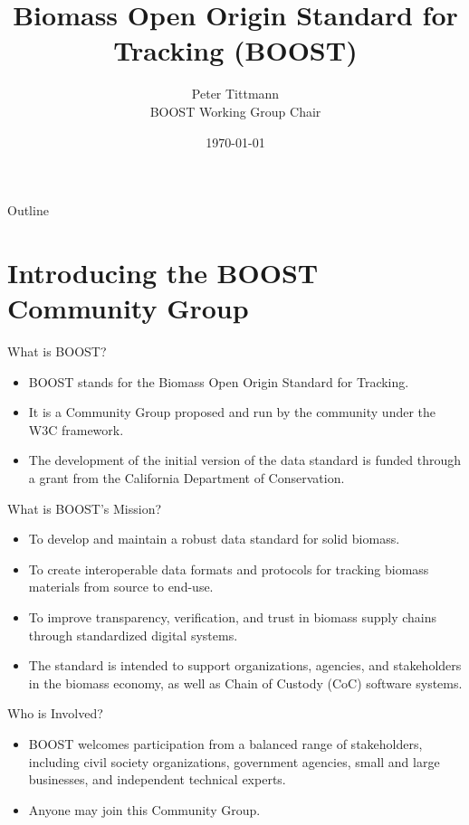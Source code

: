 \documentclass[presentation]{beamer}
\author{Peter Tittmann \\ BOOST Working Group Chair}
\date{\today}
\title{Biomass Open Origin Standard for Tracking (BOOST)}
\begin{document}
\begin{frame}{Outline}
\tableofcontents
\end{frame}

\maketitle
\section{Introducing the BOOST Community Group}
\label{introducing-the-boost-community-group}
\begin{frame}[label={sec:org826eb60}]{What is BOOST?}
\begin{itemize}
\item BOOST stands for the Biomass Open Origin Standard for Tracking.
\item It is a Community Group proposed and run by the community under the W3C framework.
\item The development of the initial version of the data standard is funded through a grant from the California Department of Conservation.
\end{itemize}
\end{frame}
\begin{frame}[label={sec:org54f85f6}]{What is BOOST's Mission?}
\begin{itemize}
\item To develop and maintain a robust data standard for solid biomass.
\item To create interoperable data formats and protocols for tracking biomass materials from source to end-use.
\item To improve transparency, verification, and trust in biomass supply chains through standardized digital systems.
\item The standard is intended to support organizations, agencies, and stakeholders in the biomass economy, as well as Chain of Custody (CoC) software systems.
\end{itemize}
\end{frame}
\begin{frame}[label={sec:org875ba66}]{Who is Involved?}
\begin{itemize}
\item BOOST welcomes participation from a balanced range of stakeholders, including civil society organizations, government agencies, small and large businesses, and independent technical experts.
\item Anyone may join this Community Group.
\end{itemize}
\end{frame}
\end{document}
